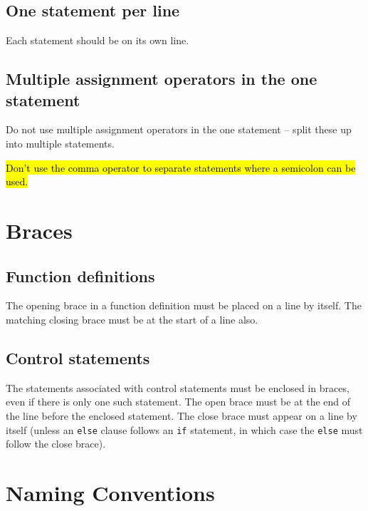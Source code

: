 \documentclass{article}
\begin{document}
\subsection{One statement per line}

Each statement should be on its own line.
\nolinenumbers
{}

\linenumbers

\subsection{Multiple assignment operators in the one statement}

Do not use multiple assignment operators in the one statement -- split these up into multiple statements.

\nolinenumbers
{}

\linenumbers

\hl{Don't use the comma operator to separate statements where a semicolon can be used.}

\section{Braces}

\subsection{Function definitions}
The opening brace in a function definition must be placed on a line by itself. The matching closing brace must be at
the start of a line also.
\nolinenumbers
{}

\linenumbers

\subsection{Control statements}
The statements associated with control statements must be enclosed in braces, even if there is only one such statement. The open brace must be at the end of the line before the enclosed statement. The close brace must appear on a line by itself (unless an \texttt{else} clause follows an \texttt{if} statement, in which case the \texttt{else} must follow the close brace).
\nolinenumbers
{}

\linenumbers

\section{Naming Conventions}
\end{document}
